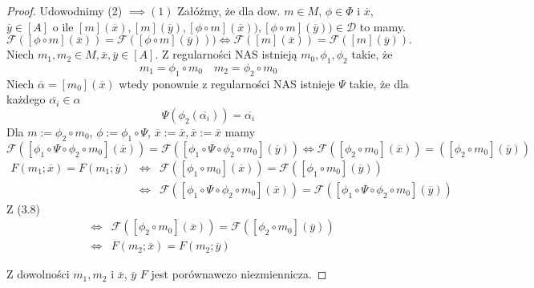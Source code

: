 \documentclass[12pt,a4paper]{report}
\newcommand{\domkniecie}[1]{\left\lbrack{#1}\right\rbrack}
\begin{document}
\begin{proof}
Udowodnimy (2) $\implies (1)$
Załóżmy, że dla dow. $m \in M$, $\phi \in \Phi$ i $\overline{x}$, $\overline{y} \in \domkniecie{A}$ o ile $\domkniecie{m}(\overline{x}), \domkniecie{
m}(\overline{y}), \domkniecie{\phi\circ m}(\overline{x})), \domkniecie{\phi\circ m}(\overline{y})) \in \mathcal{D}$ to mamy.
\begin{equation}
\mathcal{F}(\domkniecie{\phi \circ m}(\overline{x}))=\mathcal{F}(\domkniecie{\phi \circ m}(\overline{y}))) \iff \mathcal{F}(\domkniecie{m}(\overline{x}))=\mathcal{F}(\domkniecie{m}(\overline{y})).
\end{equation}
Niech $m_1,m_2 \in M, \overline{x}, \overline{y} \in \domkniecie{A}$. Z regularności NAS istnieją $m_0, \phi_1,\phi_2$ takie, że
$$ 
m_1=\phi_1\circ m_0 \quad m_2=\phi_2\circ m_0
$$
Niech $\overline{\alpha}=\domkniecie{m_0}(\overline{x})$ wtedy ponownie z regularności NAS istnieje $\Psi$ takie, że dla każdego $\overline{\alpha_i} \in \alpha$
$$
\Psi(\phi_2(\overline{\alpha_i}))=\overline{\alpha_i}
$$
Dla $m:=\phi_2 \circ m_0$, $\phi:=\phi_1\circ \Psi$, $\overline{x}:=\overline{x}, \overline{x}:=\overline{x}$ mamy $\mathcal{F}(\domkniecie{\phi_1\circ \Psi \circ \phi_2\circ m_0}(\overline{x}))=\mathcal{F}(\domkniecie{\phi_1\circ \Psi \circ \phi_2\circ m_0}(\overline{y})) \iff \mathcal{F}(\domkniecie{\phi_2\circ m_0}(\overline{x}))=(\domkniecie{\phi_2\circ m_0}(\overline{y}))$
\begin{eqnarray*}
F(m_1;\overline{x})=F(m_1;\overline{y}) & \iff  & \mathcal{F}(\domkniecie{\phi_1\circ m_0}(\overline{x}))=\mathcal{F}(\domkniecie{\phi_1 \circ m_0}(\overline{y}))\\
&  \iff & \mathcal{F}(\domkniecie{\phi_1\circ\Psi\circ\phi_2\circ m_0}(\overline{x}))=\mathcal{F}(\domkniecie{\phi_1\circ\Psi\circ\phi_2\circ m_0}(\overline{y})) 
\end{eqnarray*}
Z (3.8)
\begin{eqnarray*}
& \iff & \mathcal{F}(\domkniecie{\phi_2\circ m_0}(\overline{x}))=\mathcal{F}(\domkniecie{\phi_2\circ m_0}(\overline{y}))\\
& \iff & F(m_2;\overline{x})=F(m_2;\overline{y})
\end{eqnarray*}

Z dowolności $m_1, m_2$ i $\overline{x}$, $\overline{y}$ $F$ jest porównawczo niezmiennicza.


\end{proof}
\end{document}
